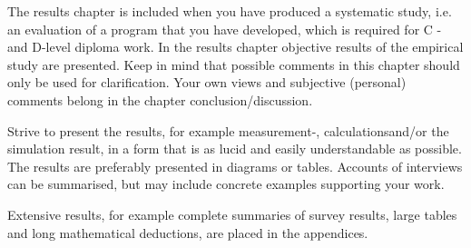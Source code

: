 The results chapter is included when you have produced a systematic
study, i.e. an evaluation of a program that you have developed, which is
required for C - and D-level diploma work. In the results chapter
objective results of the empirical study are presented. Keep in mind that
possible comments in this chapter should only be used for clarification.
Your own views and subjective (personal) comments belong in the
chapter conclusion/discussion.

Strive to present the results, for example measurement-, calculationsand/or the simulation result, in a form that is as lucid and easily
understandable as possible. The results are preferably presented in
diagrams or tables. Accounts of interviews can be summarised, but may
include concrete examples supporting your work.

Extensive results, for example complete summaries of survey results,
large tables and long mathematical deductions, are placed in the
appendices. 